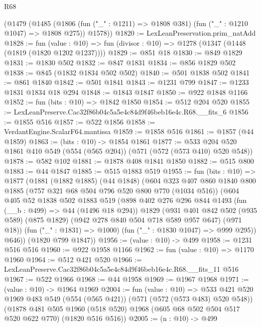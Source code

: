 \begin{lexlean}{R68}
\begin{coremodule}
    (@1479
      (@1485
        (@1806 (fun ("_" : @1211) => @1808 @381) (fun ("_" : @1210 @1047) => @1808 @275))
        @1578))
@1820 := LexLeanPreservation.prim_natAdd
@1828 := fun (value : @10) =>
  fun (divisor : @10) => @1278 (@1347 (@1448 (@1819 (@1820 @1202 @1237))))
@1829 := @851 @18
@1830 := @849 @1829
@1831 := @1830 @502
@1832 := @847 @1831
@1834 := @856 @1829 @502
@1838 := @845 (@1832 @1834 @502 @502)
@1840 := @501 @1838 @502
@1841 := @861 @1840
@1842 := @501 @1841
@1843 := @1231 @799
@1847 := @1233 @1831 @1834 @18 @294
@1848 := @1843 @1847
@1850 := @922 @1848 @1166
@1852 := fun (bits : @10) => @1842 @1850
@1854 := @512 @204 @520
@1855 := LexLeanPreserve.Cac32f86b04c5a5e4c84d9f46beb16e4c.R68.__fits_6
@1856 := @1855 @516
@1857 := @522 @1856
@1858 := VerdantEngine.ScalarF64.mantissa
@1859 := @1858 @516
@1861 := @1857 (@44 @1859)
@1863 := (bits : @10) -> @1854 @1861
@1877 := @533 @204 @520 @1861 @410 @549 (@554 (@565 @204)) (@571 (@572 (@573 @410) @520 @548))
@1878 := @582 @102
@1881 := @1878 @408 @1841 @1850
@1882 := @515 @800
@1883 := @44 @1847
@1885 := @515 @1883 @519
@1955 := fun (bits : @10) =>
  @1877
    (@1881
      (@1882 @1885)
      (@44 @1848)
      (@604
        @323
        @407
        @860
        @1840
        @800
        @1885
        (@757 @321 @68 @504 @796 @520 @800 @770 (@1034 @516))
        (@604
          @405
          @52
          @1838
          @502
          @1883
          @519
          (@898
            @402
            @276
            @296
            @844
            @1493
            (fun (__b : @499) => @44 (@1496 @18 @294))
            @1829
            (@931
              @401
              @842
              @502
              (@935 @589)
              (@875 @1829)
              (@942 @278 @840 @504 @718 @589 @957 @647)
              (@971 @18))
            (fun ("_" : @1831) => @1000)
            (fun ("_" : @1830 @1047) => @999 @295))
          @646))
      (@1820 @799 @1847))
@1956 := (value : @10) -> @499
@1958 := @1231 @516 @516
@1960 := @922 @1958 @1166
@1962 := fun (value : @10) => @1170 @1960
@1964 := @512 @421 @520
@1966 := LexLeanPreserve.Cac32f86b04c5a5e4c84d9f46beb16e4c.R68.__fits_11 @516
@1967 := @522 @1966
@1968 := @44 @1958
@1969 := @1967 @1968
@1971 := (value : @10) -> @1964 @1969
@2004 := fun (value : @10) =>
  @533
    @421
    @520
    @1969
    @483
    @549
    (@554 (@565 @421))
    (@571 (@572 (@573 @483) @520 @548))
    (@1878
      @481
      @505
      @1960
      (@518 @520)
      @1968
      (@605 @68 @502 @504 @517 @520 @622 @770)
      (@1820 @516 @516))
@2005 := (n : @10) -> @499

\end{coremodule}
\end{lexlean}
